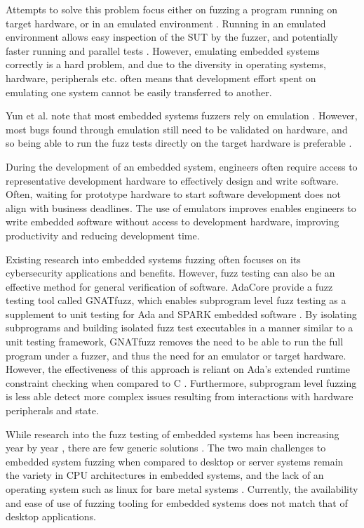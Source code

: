\documentclass[../report.tex]{subfiles}
\begin{document}
Attempts to solve this problem focus either on fuzzing a program running on
target hardware, or in an emulated environment \citep{Eisele_et_al_2022}.
Running in an emulated environment allows easy inspection of the SUT by the
fuzzer, and potentially faster running and parallel tests
\citep{Eisele_et_al_2022}. However, emulating embedded systems correctly is a
hard problem, and due to the diversity in operating systems, hardware,
peripherals etc. often means that development effort spent on emulating one
system cannot be easily transferred to another.


Yun et al. note that most embedded systems fuzzers rely on emulation
\citep{Yun_2022}. However, most bugs found through emulation still need to be
validated on hardware, and so being able to run the fuzz tests directly on the
target hardware is preferable \citep{Eisele_et_al_2022}.

During the development of an embedded system, engineers often require access to
representative development hardware to effectively design and write software.
Often, waiting for prototype hardware to start software development does not
align with business deadlines. The use of emulators improves enables engineers
to write embedded software without access to development hardware, improving
productivity and reducing development time.

Existing research into embedded systems fuzzing often focuses on its
cybersecurity applications and benefits. However, fuzz testing can also be an
effective method for general verification of software. AdaCore provide a fuzz
testing tool called GNATfuzz, which enables subprogram level fuzz testing as a
supplement to unit testing for Ada and SPARK embedded software
\citep{gnatfuzz}. By isolating subprograms and building isolated fuzz test
executables in a manner similar to a unit testing framework, GNATfuzz removes
the need to be able to run the full program under a fuzzer, and thus the need
for an emulator or target hardware. However, the effectiveness of this approach
is reliant on Ada's extended runtime constraint checking when compared to C
\citep{gnatfuzz}. Furthermore, subprogram level fuzzing is less able detect
more complex issues resulting from interactions with hardware peripherals and
state.

While research into the fuzz testing of embedded systems has been increasing
year by year \citep{Yun_2022}, there are few generic solutions
\citep{Eisele_et_al_2022}. The two main challenges to embedded system fuzzing
when compared to desktop or server systems remain the variety in CPU
architectures in embedded systems, and the lack of an operating system such as
linux for bare metal systems \citep{Eisele_et_al_2022}. Currently, the
availability and ease of use of fuzzing tooling for embedded systems does not
match that of desktop applications.
\end{document}
